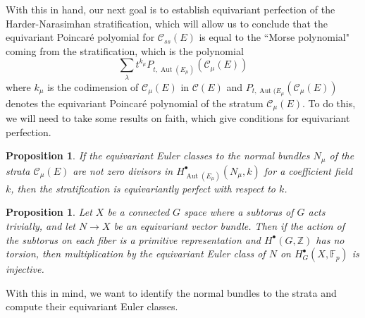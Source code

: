 \documentclass[psamsfonts, 12pt]{amsart}
\newtheorem{prop}[thm]{Proposition}
\theoremstyle{definition}
\theoremstyle{remark}
\newcommand{\Z}{\mathbb{Z}}
\newcommand{\F}{\mathbb{F}}
\DeclareMathOperator{\Aut}{Aut}
\begin{document}
With this in hand, our next goal is to establish equivariant perfection of the
Harder-Narasimhan stratification, which will allow us to conclude that the
equivariant Poincar\'e polyomial for $\mathscr{C}_{ss}(E)$ is equal to the
``Morse polynomial" coming from the stratification, which is the polynomial
\[
\sum_\lambda t^{k_\mu} P_{t,\Aut(E_\mu)}(\mathscr{C}_\mu(E))
\]
where $k_\mu$ is the codimension of $\mathscr{C}_\mu(E)$ in $\mathscr{C}(E)$
and $P_{t,\Aut(E_\mu}(\mathscr{C}_\mu(E))$ denotes the equivariant Poincar\'e
polynomial of the stratum $\mathscr{C}_\mu(E)$. To do this, we will need to take
some results on faith, which give conditions for equivariant perfection.
%
\begin{prop}
If the equivariant Euler classes to the normal bundles $N_\mu$ of the strata
$\mathscr{C}_\mu(E)$ are not zero divisors in $H^\bullet_{\Aut(E_\mu)}(N_\mu, k)$
for a coefficient field $k$, then the stratification is equivariantly perfect
with respect to $k$.
\end{prop}
%
\begin{prop}
Let $X$ be a connected $G$ space where a subtorus of $G$ acts trivially,
and let $N \to X$ be an equivariant vector bundle. Then if the action of the
subtorus on each fiber is a primitive representation and $H^\bullet(G,\Z)$
has no torsion, then multiplication by the equivariant Euler class of
$N$ on $H_G^\bullet(X,\F_p)$ is injective.
\end{prop}
%
With this in mind, we want to identify the normal bundles to the strata
and compute their equivariant Euler classes.
%
\newpage
%
\nocite{*}
%
\printbibliography
%
\end{document}
